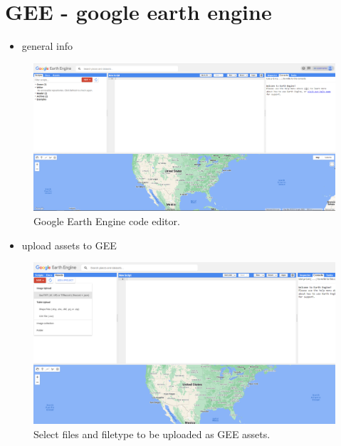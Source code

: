 \documentclass[
  10pt,
  b5paper,
  oneside]{book}
\providecommand{\tightlist}{%
  \setlength{\itemsep}{0pt}\setlength{\parskip}{0pt}}
\begin{document}
\hypertarget{gee---google-earth-engine}{%
\section{GEE - google earth engine}\label{gee---google-earth-engine}}

\begin{itemize}
\tightlist
\item
  general info
\end{itemize}

\begin{figure}
\includegraphics[width=12cm]{images/2.1_GEE_codeeditor} \caption{Google Earth Engine code editor.}\label{fig:unnamed-chunk-1}
\end{figure}

\begin{itemize}
\tightlist
\item
  upload assets to GEE
\end{itemize}

\begin{figure}
\includegraphics[width=12cm]{images/2.2_upload-assets-1} \caption{Select files and filetype to be uploaded as GEE assets.}\label{fig:unnamed-chunk-2}
\end{figure}
\end{document}
